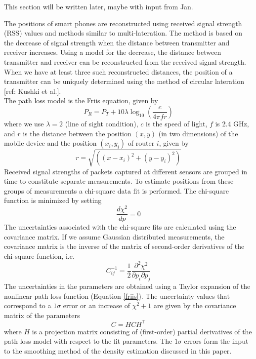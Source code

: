 \documentclass[10pt,a4paper]{article}
\begin{document}
This section will be written later, maybe with input from Jan. 

The positions of smart phones are reconstructed using received signal strength (RSS) values and methods similar to multi-lateration. 
The method is based on the decrease of signal strength when the distance between transmitter and receiver increases.
Using a model for the decrease, the distance between transmitter and receiver can be reconstructed from the received signal strength.
When we have at least three such reconstructed distances, the position of a transmitter can be uniquely determined using the method of circular lateration [ref: Kushki et al.].\\
The path loss model is the Friis equation, given by
\begin{equation}
P_{R}=P_{T}+10\lambda\log_{10}(\frac{c}{4\pi fr})
\label{friis}
\end{equation}
where we use $\lambda=2$ (line of sight condition), $c$ is the speed of light, $f$ is 2.4 GHz, and $r$ is the distance between the position $(x,y)$ (in two dimensions) of the mobile device and the position $(x_{i},y_{i})$ of router $i$, given by 
\begin{equation}
r=\sqrt{((x-x_{i})^2+(y-y_{i})^2)}
\end{equation}
Received signal strengths of packets captured at different sensors are grouped in time to constitute separate measurements. 
To estimate positions from these groups of measurements a chi-square data fit is performed.
The chi-square function is minimized by setting
\begin{equation}
\frac{d\chi^2}{dp}=0
\end{equation}
The uncertainties associated with the chi-square fits are calculated using the covariance matrix.
If we assume Gaussian distributed measurements, the covariance matrix is the inverse of the matrix of second-order derivatives of the chi-square function, i.e.
\begin{equation}
C_{ij}^{-1}=\frac{1}{2}\frac{\partial^2\chi^2}{\partial p_{i}\partial p_{j}}
\end{equation}
The uncertainties in the parameters are obtained using a Taylor expansion of the nonlinear path loss function (Equation \ref{friis}).
The uncertainty values that correspond to a $1\sigma$ error or an increase of $\chi^2+1$ are given by the covariance matrix of the parameters
\begin{equation}
C=HCH^\top
\end{equation}
where $H$ is a projection matrix consisting of (first-order) partial derivatives of the path loss model with respect to the fit parameters.
The $1\sigma$ errors form the input to the smoothing method of the density estimation discussed in this paper.
\end{document}
